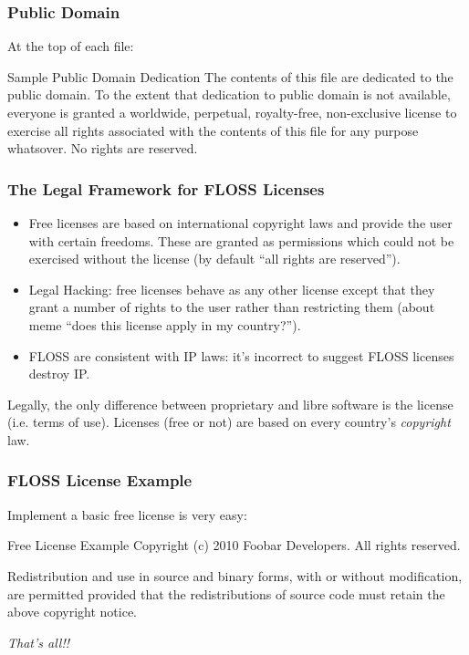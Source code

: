 
\begin{frame}
\frametitle{Public Domain}

At the top of each file:
\begin{block}{Sample Public Domain Dedication}
The contents of this file are dedicated to the public domain. To the extent that dedication to public domain is not available, everyone is granted a worldwide, perpetual, royalty-free, non-exclusive license to exercise all rights associated with the contents of this file for any purpose whatsover. No rights are reserved.
\end{block}

\end{frame}

\begin{frame}
\frametitle{The Legal Framework for FLOSS Licenses}
\begin{itemize}
\item Free licenses are based on international copyright laws and provide the user with certain freedoms. These are granted as permissions which \alert{could not be exercised} without the license (by default ``all rights are reserved'').
\item \alert{Legal Hacking:} free licenses behave as any other license except that they grant a number of rights to the user rather than restricting them (about meme ``does this license apply in my country?'').
\item FLOSS are consistent with IP laws: it's incorrect to suggest FLOSS licenses destroy IP.
\end{itemize}

\alert{Legally, the only difference between proprietary and libre software is the license (i.e. terms of use). Licenses (free or not) are based on every country's \textit{copyright} law.}

\end{frame}


\begin{frame}
\frametitle{FLOSS License Example}

Implement a basic free license is very easy: 

\begin{block}{Free License Example}
Copyright (c) 2010 Foobar Developers. All rights reserved. 

\medskip
Redistribution and use in source and binary forms, with or without modification, are permitted provided that the redistributions of source code must retain the above copyright notice.
\end{block}

\textit{That's all!!}

\end{frame}

